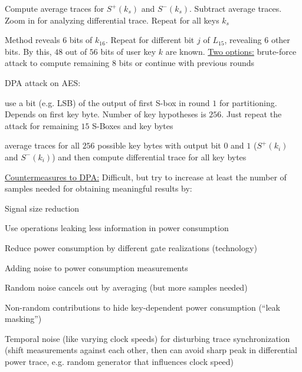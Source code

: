\documentclass[landscape, a4paper]{article}
\begin{document}
\begin{minipage}[t]{0.2\linewidth}
\begin{betterlist}
\begin{betterlist}
			\begin{betterlist}
				\item Compute average traces for $S^+(k_s)$ and $S^−(k_s)$. Subtract average traces. Zoom in for analyzing differential trace. Repeat for all keys $k_s$
				\item Method reveals $6$ bits of $k_{16}$. Repeat for different bit $j$ of $L_{15}$, revealing $6$ other bits. By this, $48$ out of $56$ bits of user key $k$ are known. \underline{Two options:} brute-force attack to compute remaining $8$ bits or continue with previous rounds
			\end{betterlist}
		\end{betterlist}
		\begin{betterlist}
			\item \alert{DPA attack on AES:}
			\begin{betterlist}
				\item use a bit (e.g. LSB) of the output of first S-box in round $1$ for partitioning. Depends on first key byte. Number of key hypotheses is $256$. Just repeat the attack for remaining $15$ S-Boxes and key bytes
				\item average traces for all $256$ possible key bytes with output bit $0$ and $1$ ($S^+(k_i)$ and $S^-(k_i)$) and then compute differential trace for all key bytes
			\end{betterlist}
			\item \underline{Countermeasures to DPA:} Difficult, but try to increase at least the number of samples needed for obtaining meaningful results by:
			\begin{betterlist}
				\item Signal size reduction
				\begin{betterlist}
					\item Use operations leaking less information in power consumption
					\item Reduce power consumption by different gate realizations (technology)
				\end{betterlist}
				\item Adding noise to power consumption measurements
				\begin{betterlist}
					\item Random noise cancels out by averaging (but more samples needed)
					\item Non-random contributions to hide key-dependent power consumption (\enquote{leak masking})
					\item Temporal noise (like varying clock speeds) for disturbing trace synchronization (shift measurements against each other, then can avoid sharp peak in differential power trace, e.g. random generator that influences clock speed)

\end{betterlist}
\end{betterlist}
\end{betterlist}
\end{betterlist}
\end{minipage}
\end{document}
